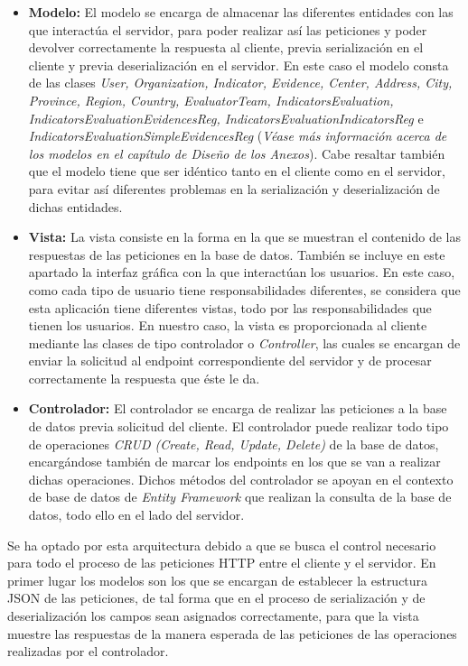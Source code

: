 \begin{itemize}
    \item \textbf{Modelo: }El modelo se encarga de almacenar las diferentes
    entidades con las que interactúa el servidor, para poder realizar así las
    peticiones y poder devolver correctamente la respuesta al cliente, previa
    serialización en el cliente y previa deserialización en el servidor. En este
    caso el modelo consta de las clases \textit{User, Organization, Indicator,
    Evidence, Center, Address, City, Province, Region, Country, EvaluatorTeam, IndicatorsEvaluation, IndicatorsEvaluationEvidencesReg, IndicatorsEvaluationIndicatorsReg} e
    \textit{IndicatorsEvaluationSimpleEvidencesReg} (\textit{Véase más información acerca de
    los modelos en el capítulo de Diseño de los Anexos}). Cabe resaltar también
    que el modelo tiene que ser idéntico tanto en el cliente como en el
    servidor, para evitar así diferentes problemas en la serialización y
    deserialización de dichas entidades. 
    \item \textbf{Vista: }La vista consiste en la forma en la que se muestran el
    contenido de las respuestas de las peticiones en la base de datos. También
    se incluye en este apartado la interfaz gráfica con la que interactúan los
    usuarios. En este caso, como cada tipo de usuario tiene responsabilidades
    diferentes, se considera que esta aplicación tiene diferentes vistas, todo
    por las responsabilidades que tienen los usuarios. En nuestro caso, la vista
    es proporcionada al cliente mediante las clases de tipo controlador o \textit{Controller},
    las cuales se encargan de enviar la solicitud al endpoint correspondiente
    del servidor y de procesar correctamente la respuesta que éste le da.
    \item \textbf{Controlador: }El controlador se encarga de realizar las
    peticiones a la base de datos previa solicitud del cliente. El controlador
    puede realizar todo tipo de operaciones \textit{CRUD (Create, Read, Update,
    Delete)} de la base de datos, encargándose también de marcar los endpoints
    en los que se van a realizar dichas operaciones. Dichos métodos del
    controlador se apoyan en el contexto de base de datos de \textit{Entity Framework} que realizan la consulta de
    la base de datos, todo ello en el lado del servidor.
\end{itemize}

Se ha optado por esta arquitectura debido a que se busca el control necesario
para todo el proceso de las peticiones HTTP entre el cliente y el servidor. En
primer lugar los modelos son los que se encargan de establecer la estructura
JSON de las peticiones, de tal forma que en el proceso de serialización y de
deserialización los campos sean asignados correctamente, para que la vista
muestre las respuestas de la manera esperada de las peticiones de las
operaciones realizadas por el controlador.

